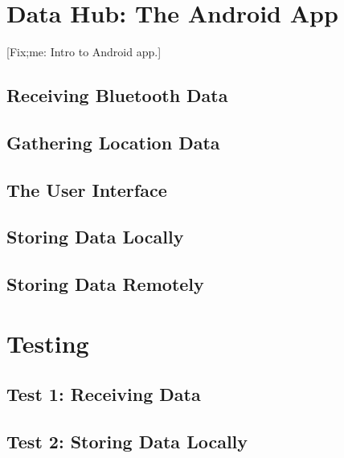 \documentclass[11pt, a4paper, oneside, english]{scrbook}
\begin{document}
\chapter{Data Hub: The Android App} %
\label{cha:data_hub}
[Fix;me: Intro to Android app.]
\section{Receiving Bluetooth Data} %
\label{sec:receiving_bluetooth_data}

\section{Gathering Location Data} %
\label{sec:gathering_location_data}

\section{The User Interface} %
\label{sec:the_user_interface}

\section{Storing Data Locally} %
\label{sec:storing_data_locally}

\section{Storing Data Remotely} %
\label{sec:storing_data_remotely}

\chapter{Testing} %
\label{cha:testing}
\section{Test 1: Receiving Data} %
\label{sec:test_1_receiving_data}

\section{Test 2: Storing Data Locally} %
\label{sec:test_2_storing_data_locally}
\end{document}
